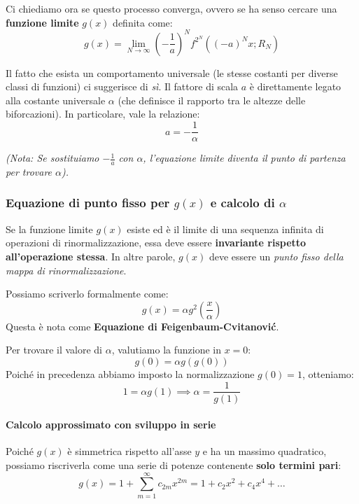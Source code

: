 \documentclass[openany]{book}
\theoremstyle{definition}
\theoremstyle{remark}
\begin{document}
Ci chiediamo ora se questo processo converga, ovvero se ha senso cercare una \textbf{funzione limite} $g(x)$ definita come:
\begin{equation}
    g(x) = \lim_{N \to \infty} \left(-\frac{1}{a}\right)^N f^{2^N}((-a)^N x; R_N)
\end{equation}

Il fatto che esista un comportamento universale (le stesse costanti per diverse classi di funzioni) ci suggerisce di \emph{sì}. Il fattore di scala $a$ è direttamente legato alla costante universale $\alpha$ (che definisce il rapporto tra le altezze delle biforcazioni). In particolare, vale la relazione:
\begin{equation}
    a = -\frac{1}{\alpha}
\end{equation}

\textit{(Nota: Se sostituiamo $-\frac{1}{a}$ con $\alpha$, l'equazione limite diventa il punto di partenza per trovare $\alpha$).}

\subsubsection*{Equazione di punto fisso per $g(x)$ e calcolo di $\alpha$}

Se la funzione limite $g(x)$ esiste ed è il limite di una sequenza infinita di operazioni di rinormalizzazione, essa deve essere \textbf{invariante rispetto all'operazione stessa}. In altre parole, $g(x)$ deve essere un \emph{punto fisso della mappa di rinormalizzazione}.

Possiamo scriverlo formalmente come:
\begin{equation}
    g(x) = \alpha g^2\left(\frac{x}{\alpha}\right)
\end{equation}
Questa è nota come \textbf{Equazione di Feigenbaum-Cvitanović}.

Per trovare il valore di $\alpha$, valutiamo la funzione in $x = 0$:
\begin{equation}
    g(0) = \alpha g(g(0))
\end{equation}
Poiché in precedenza abbiamo imposto la normalizzazione $g(0) = 1$, otteniamo:
\begin{equation}
    1 = \alpha g(1) \implies \alpha = \frac{1}{g(1)}
\end{equation}

\paragraph{Calcolo approssimato con sviluppo in serie}
Poiché $g(x)$ è simmetrica rispetto all'asse $y$ e ha un massimo quadratico, possiamo riscriverla come una serie di potenze contenente \textbf{solo termini pari}:
\begin{equation}
    g(x) = 1 + \sum_{m=1}^{\infty} c_{2m} x^{2m} = 1 + c_2 x^2 + c_4 x^4 + \dots
\end{equation}
\end{document}
